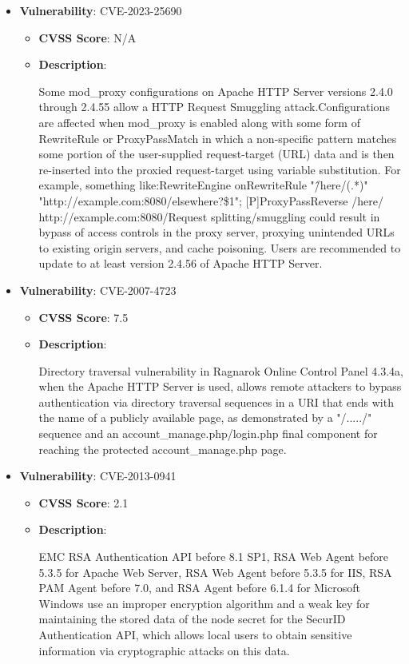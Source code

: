 \documentclass{article}
\begin{document}
\begin{itemize}
        \item \textbf{Vulnerability}: CVE-2023-25690
        \begin{itemize}
            \item \textbf{CVSS Score}:  N/A 
            \item \textbf{Description}:
            \parbox[t]{0.9\linewidth}{
                \ttfamily Some mod\_proxy configurations on Apache HTTP Server versions 2.4.0 through 2.4.55 allow a HTTP Request Smuggling attack.Configurations are affected when mod\_proxy is enabled along with some form of RewriteRule or ProxyPassMatch in which a non-specific pattern matches some portion of the user-supplied request-target (URL) data and is then re-inserted into the proxied request-target using variable substitution. For example, something like:RewriteEngine onRewriteRule "\^/here/(.*)" "http://example.com:8080/elsewhere?\$1"; [P]ProxyPassReverse /here/ http://example.com:8080/Request splitting/smuggling could result in bypass of access controls in the proxy server, proxying unintended URLs to existing origin servers, and cache poisoning. Users are recommended to update to at least version 2.4.56 of Apache HTTP Server.
            }
        \end{itemize}
    
        \item \textbf{Vulnerability}: CVE-2007-4723
        \begin{itemize}
            \item \textbf{CVSS Score}:  7.5 
            \item \textbf{Description}:
            \parbox[t]{0.9\linewidth}{
                \ttfamily Directory traversal vulnerability in Ragnarok Online Control Panel 4.3.4a, when the Apache HTTP Server is used, allows remote attackers to bypass authentication via directory traversal sequences in a URI that ends with the name of a publicly available page, as demonstrated by a "/...../" sequence and an account\_manage.php/login.php final component for reaching the protected account\_manage.php page.
            }
        \end{itemize}
    
        \item \textbf{Vulnerability}: CVE-2013-0941
        \begin{itemize}
            \item \textbf{CVSS Score}:  2.1 
            \item \textbf{Description}:
            \parbox[t]{0.9\linewidth}{
                \ttfamily EMC RSA Authentication API before 8.1 SP1, RSA Web Agent before 5.3.5 for Apache Web Server, RSA Web Agent before 5.3.5 for IIS, RSA PAM Agent before 7.0, and RSA Agent before 6.1.4 for Microsoft Windows use an improper encryption algorithm and a weak key for maintaining the stored data of the node secret for the SecurID Authentication API, which allows local users to obtain sensitive information via cryptographic attacks on this data.
            }
        \end{itemize}
    

\end{itemize}
\end{document}
